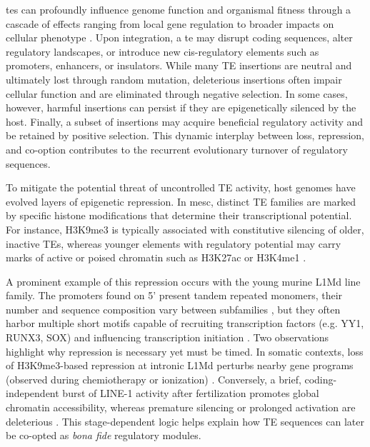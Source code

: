 \documentclass[11pt]{book}
\begin{document}
\glspl{te} can profoundly influence genome function and organismal fitness through a cascade of effects ranging from local gene regulation to broader impacts on cellular phenotype \cite{chuong_regulatory_2017}. Upon integration, a \gls{te} may disrupt coding sequences, alter regulatory landscapes, or introduce new cis-regulatory elements such as promoters, enhancers, or insulators. While many TE insertions are neutral and ultimately lost through random mutation, deleterious insertions often impair cellular function and are eliminated through negative selection. In some cases, however, harmful insertions can persist if they are epigenetically silenced by the host. Finally, a subset of insertions may acquire beneficial regulatory activity and be retained by positive selection. This dynamic interplay between loss, repression, and co-option contributes to the recurrent evolutionary turnover of regulatory sequences.

To mitigate the potential threat of uncontrolled TE activity, host genomes have evolved layers of epigenetic repression. In \gls{mesc}, distinct TE families are marked by specific histone modifications that determine their transcriptional potential. For instance, H3K9me3 is typically associated with constitutive silencing of older, inactive TEs, whereas younger elements with regulatory potential may carry marks of active or poised chromatin such as H3K27ac or H3K4me1 \cite{he_transposable_2019}.

A prominent example of this repression occurs with the young murine L1Md \gls{line} family. The promoters found on 5' present tandem repeated monomers, their number and sequence composition vary between subfamilies \cite{zhou_subtype_2019}, but they often harbor multiple short motifs capable of recruiting transcription factors (e.g. YY1, RUNX3, SOX) and influencing transcription initiation \cite{elmer_genomic_2021}. Two observations highlight why repression is necessary yet must be timed. In somatic contexts, loss of H3K9me3-based repression at intronic L1Md perturbs nearby gene programs (observed during chemiotherapy or ionization) \cite{pelinski_nf-b_2022}. Conversely, a brief, coding-independent burst of LINE-1 activity after fertilization promotes global chromatin accessibility, whereas premature silencing or prolonged activation are deleterious \cite{jachowicz_line-1_2017}. This stage-dependent logic helps explain how TE sequences can later be co-opted as \textit{bona fide} regulatory modules.
\end{document}
